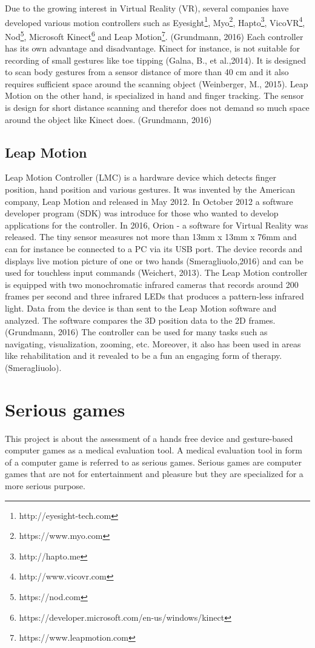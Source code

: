 Due to the growing interest in Virtual Reality (VR), several companies have developed various motion controllers such as Eyesight\footnote{http://eyesight-tech.com}, Myo\footnote{https://www.myo.com}, Hapto\footnote{http://hapto.me}, VicoVR\footnote{http://www.vicovr.com}, Nod\footnote{https://nod.com}, Microsoft Kinect\footnote{https://developer.microsoft.com/en-us/windows/kinect} and Leap Motion\footnote{https://www.leapmotion.com}. (Grundmann, 2016)
Each controller has its own advantage and disadvantage. Kinect for instance, is not suitable for recording of small gestures like toe tipping (Galna, B., et al.,2014). It is designed to scan body gestures from a sensor distance of more than 40 cm and it also requires sufficient space around the scanning object (Weinberger, M., 2015).
Leap Motion on the other hand, is specialized in hand and finger tracking. The sensor is design for short distance scanning and therefor does not demand so much space around the object like Kinect does. (Grundmann, 2016)


\subsection{Leap Motion}
Leap Motion Controller (LMC) is a hardware device which detects finger position, hand position and various gestures. It was invented by the American company, Leap Motion and released in May 2012. In October 2012 a software developer program (SDK) was introduce for those who wanted to develop applications for the controller. In 2016, Orion - a software for Virtual Reality was released. The tiny sensor measures not more than 13mm x 13mm x 76mm and can for instance be connected to a PC via its USB port. The device records and displays live motion picture of one or two hands (Smeragliuolo,2016) and can be used for touchless input commands (Weichert, 2013).
The Leap Motion controller is equipped with two monochromatic infrared cameras that records around 200 frames per second  and three infrared LEDs that produces a pattern-less infrared light. Data from the device is than sent to the Leap Motion software and analyzed. The software compares the 3D position data to the 2D frames. (Grundmann, 2016)
The controller can be used for many tasks such as navigating, visualization, zooming, etc. Moreover, it also has been used in areas like rehabilitation and it revealed to be a fun an engaging form of therapy.
(Smeragliuolo).


\section{Serious games}
\label{sec:seriousgames}
This project is about the assessment of a hands free device and gesture-based computer games as a medical evaluation tool. A medical evaluation tool in form of a computer game is referred to as serious games. Serious games are computer games that are not for entertainment and pleasure but they are specialized for a more serious purpose. 

